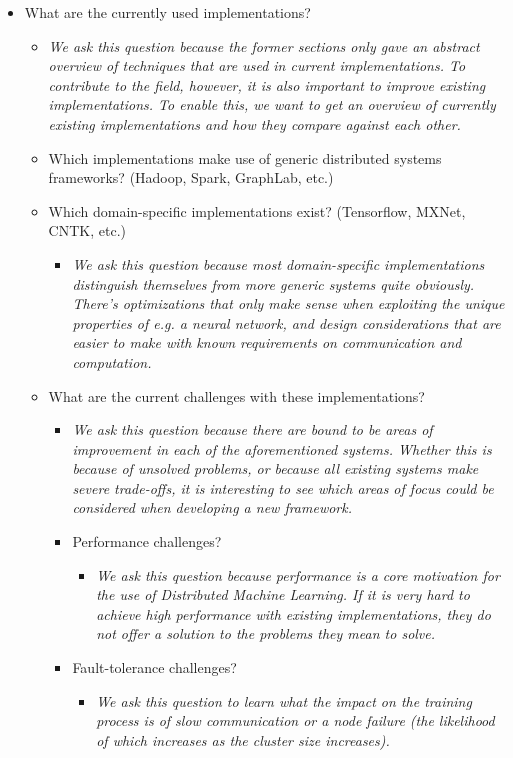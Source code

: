 \begin{itemize}
\begin{itemize}
	\end{itemize}
	\item What are the currently used implementations?
	\begin{itemize}
		\item \textit{We ask this question because the former sections only gave an abstract overview of techniques that are used in current implementations. To contribute to the field, however, it is also important to improve existing implementations. To enable this, we want to get an overview of currently existing implementations and how they compare against each other.}
		\item Which implementations make use of generic distributed systems frameworks? (Hadoop, Spark, GraphLab, etc.)
		\item Which domain-specific implementations exist? (Tensorflow, MXNet, CNTK, etc.)
		\begin{itemize}
			\item \textit{We ask this question because most domain-specific implementations distinguish themselves from more generic systems quite obviously. There’s optimizations that only make sense when exploiting the unique properties of e.g. a neural network, and design considerations that are easier to make with known requirements on communication and computation.}
		\end{itemize}
		\item What are the current challenges with these implementations?
		\begin{itemize}
			\item \textit{We ask this question because there are bound to be areas of improvement in each of the aforementioned systems. Whether this is because of unsolved problems, or because all existing systems make severe trade-offs, it is interesting to see which areas of focus could be considered when developing a new framework.}
			\item Performance challenges?
			\begin{itemize}
				\item \textit{We ask this question because performance is a core motivation for the use of Distributed Machine Learning. If it is very hard to achieve high performance with existing implementations, they do not offer a solution to the problems they mean to solve.}
			\end{itemize}
			\item Fault-tolerance challenges?
			\begin{itemize}
				\item \textit{We ask this question to learn what the impact on the training process is of slow communication or a node failure (the likelihood of which increases as the cluster size increases).}

\end{itemize}
\end{itemize}
\end{itemize}
\end{itemize}
